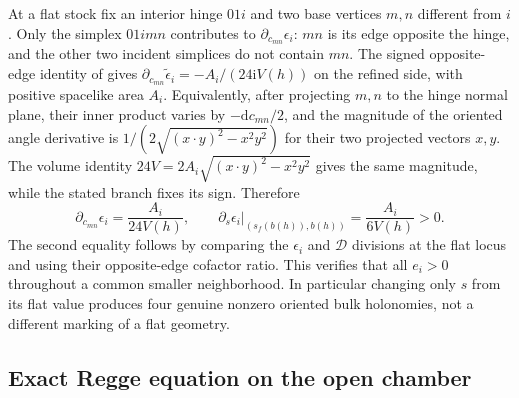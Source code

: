 \documentclass[11pt]{article}
\newcommand{\dd}{\mathrm d}
\newcommand{\I}{\mathrm i}
\newcommand{\calD}{\mathcal D}
\begin{document}
At a flat stock fix an interior hinge \(01i\) and two base vertices \(m,n\) different from \(i\). Only the simplex \(01imn\) contributes to \(\partial_{c_{mn}}\epsilon_i\): \(mn\) is its edge opposite the hinge, and the other two incident simplices do not contain \(mn\). The signed opposite-edge identity of \cite[Eqs.~(39), (45), App.~A.7]{BD} gives \(\partial_{c_{mn}}\widetilde\epsilon_i=-A_i/(24\I V(h))\) on the refined side, with positive spacelike area \(A_i\). Equivalently, after projecting \(m,n\) to the hinge normal plane, their inner product varies by \(-\dd c_{mn}/2\), and the magnitude of the oriented angle derivative is \(1/(2\sqrt{(x\cdot y)^2-x^2y^2})\) for their two projected vectors \(x,y\). The volume identity \(24 V=2A_i\sqrt{(x\cdot y)^2-x^2y^2}\) gives the same magnitude, while the stated branch fixes its sign. Therefore
\begin{equation}\label{eq:slopes}
 \partial_{c_{mn}}\epsilon_i=\frac{A_i}{24V(h)},\qquad
 \partial_s\epsilon_i\big|_{(s_f(b(h)),b(h))}
    =\frac{A_i}{6V(h)}>0 .
\end{equation}
The second equality follows by comparing the \(\epsilon_i\) and \(\calD\) divisions at the flat locus and using their opposite-edge cofactor ratio. This verifies that all \(e_i>0\) throughout a common smaller neighborhood. In particular changing only \(s\) from its flat value produces four genuine nonzero oriented bulk holonomies, not a different marking of a flat geometry.

\subsection{Exact Regge equation on the open chamber}
\end{document}
